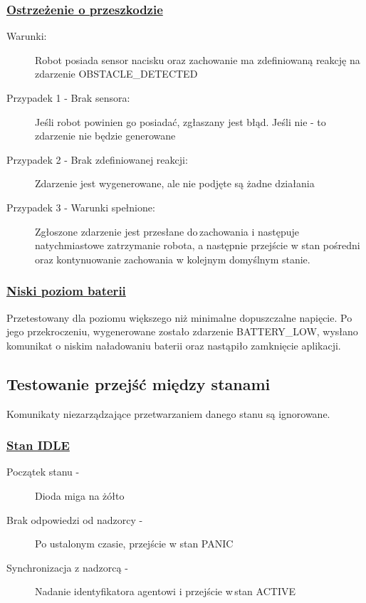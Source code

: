 \subsubsection{\underline{Ostrzeżenie o przeszkodzie}}

\begin{description}
    \item[Warunki:]Robot posiada sensor nacisku oraz zachowanie ma zdefiniowaną reakcję na zdarzenie OBSTACLE\_DETECTED
    \item[Przypadek 1 - Brak sensora:]Jeśli robot powinien go posiadać, zgłaszany jest błąd. Jeśli nie - to zdarzenie nie będzie generowane
    \item[Przypadek 2 - Brak zdefiniowanej reakcji:]Zdarzenie jest wygenerowane, ale nie podjęte są żadne działania
    \item[Przypadek 3 - Warunki spełnione:]Zgłoszone zdarzenie jest przesłane do\,zachowania i następuje natychmiastowe zatrzymanie robota, a następnie przejście w stan pośredni oraz kontynuowanie zachowania w kolejnym domyślnym stanie.\\
\end{description}

\subsubsection{\underline{Niski poziom baterii}}

Przetestowany dla poziomu większego niż minimalne dopuszczalne napięcie. Po\,jego przekroczeniu, wygenerowane zostało zdarzenie BATTERY\_LOW, wysłano komunikat o niskim naładowaniu baterii oraz nastąpiło zamknięcie aplikacji.

\subsection{Testowanie przejść między stanami}

Komunikaty niezarządzające przetwarzaniem danego stanu są ignorowane.

\subsubsection{\underline{Stan IDLE}}

\begin{description}
    \item[Początek stanu -]Dioda miga na żółto
    \item[Brak odpowiedzi od nadzorcy -]Po ustalonym czasie, przejście w stan PANIC
    \item[Synchronizacja z nadzorcą -]Nadanie identyfikatora agentowi i przejście w\,stan ACTIVE
\end{description}


